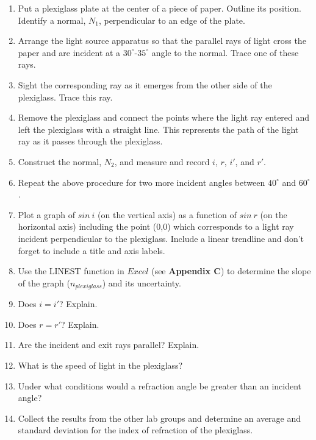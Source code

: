 \begin{enumerate}
\item Put a plexiglass plate at the center of a piece of paper. Outline
its position. Identify a normal, $N_1$, perpendicular to an edge of
the plate.
\item Arrange the light source apparatus so that the parallel rays of light
cross the paper and are incident at a $30^\circ$-$35^\circ$ angle
to the normal. Trace one of these rays.
\item Sight the corresponding ray as it emerges from the other side of the
plexiglass. Trace this ray.
\item Remove the plexiglass and connect the points where the light ray entered 
and left the plexiglass with a straight line. This represents the path of the 
light ray as it passes through the plexiglass.
\item Construct the normal, $N_2$, and measure and record $i$, $r$, $i'$, and $r'$. \vspace{20mm}

\item Repeat the above procedure for two more incident angles between
$40^\circ$ and $60^\circ$. \vspace{30mm}
\item Plot a graph of $sin~i$ (on the vertical axis) as a function of $sin~r$ 
(on the horizontal axis) including the point (0,0) which corresponds to a 
light ray incident perpendicular to the plexiglass. Include a linear trendline 
and don't forget to include a title and axis labels.
\item Use the LINEST function in $Excel$ (see \textbf{Appendix C}) to 
determine the slope of the graph ($n_{plexiglass}$) and its uncertainty.
\vspace{25mm}

\item Does $i = i'$? Explain.\vspace{20mm}

\item Does $r = r'$? Explain.\vspace{20mm}

\item Are the incident and exit rays parallel? Explain.\vspace{20mm}

\item What is the speed of light in the plexiglass?\vspace{25mm}

\item Under what conditions would a refraction angle be greater than an
incident angle?\vspace{25mm}
\item Collect the results from the other lab groups and determine an average 
and standard deviation for the index of refraction of the plexiglass.
\end{enumerate}

